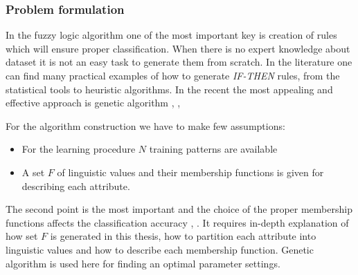 \subsubsection{Problem formulation}
\label{cha:Fuzzy_logic_basic_problem_formulation}
In the fuzzy logic algorithm one of the most important key is creation of rules
which will ensure proper classification. When there is no expert knowledge about
dataset it is not an easy task to generate them from scratch. In the literature
one can find many practical examples of how to generate \textit{IF-THEN} rules, from
the statistical tools to heuristic algorithms. In the recent the most appealing
and effective approach is genetic algorithm \cite{bib4}, \cite{bib13}, \cite{bib23}

For the algorithm construction we have to make few assumptions:
\begin{itemize}
    \item For the learning procedure $N$ training patterns are available
    \item A set $F$ of linguistic values and their membership functions is given
        for describing each attribute. 
\end{itemize}
The second point is the most important and the choice of the proper membership
functions affects the classification accuracy \cite{bib17}, \cite{bib6}. It requires in-depth explanation
of how set $F$ is generated in this thesis, how to partition each attribute into 
linguistic values and how to describe each membership function. Genetic
algorithm is used here for finding an optimal parameter settings. 


